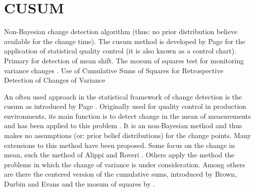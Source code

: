\section{CUSUM}\label{cusum}




Non-Bayesian change detection algorithm (thus: no prior distribution believe available for the change time).
The \gls{cusum} method is developed by Page \cite{page1954continuous} for the application of statistical quality control (it is also known as a control chart).
Primary for detection of mean shift.
The \gls{mosum} of squares test for monitoring variance changes \cite{hsu2007mosum}.
Use of Cumulative Sums of Squares for Retrospective Detection of Changes of Variance \cite{inclan1994use}

An often used approach in the statistical framework of change detection is the \gls{cusum} as introduced by Page \cite{page1954continuous}.
Originally used for quality control in production environments, its main function is to detect change in the mean of measurements and has been applied to this problem \cite{basseville1993detection}.
It is an non-Bayesian method and thus makes no assumptions (or: prior belief distributions) for the change points.
Many extensions to this method have been proposed.
Some focus on the change in mean, such the method of Alippi and Roveri \cite{alippi2006adaptive}.
Others apply the method the problems in which the change of variance is under consideration.
Among others are there the centered version of the cumulative sums, introduced by Brown, Durbin and Evans \cite{brown1975techniques} and the \gls{mosum} of squares by \cite{hsu2007mosum}.

